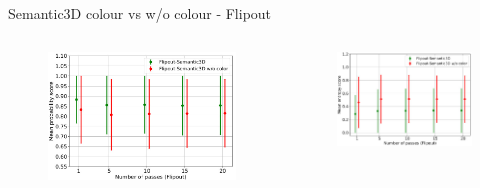 \documentclass[aspectratio=169]{beamer}
\begin{document}
\begin{frame}{Semantic3D colour vs w/o colour - Flipout}
    \begin{columns}
        \begin{column}{0.5\textwidth}
            \begin{figure}
                \centering
                \includegraphics[scale=0.25]{images/ood2/Fout_MSP_OOD2.jpg}
            \end{figure}
        \end{column}
        \begin{column}{0.5\textwidth}
            \begin{figure}
                \centering
                \includegraphics[scale=0.32]{images/ood2/Fout_Ent_OOD2.jpg}

\end{figure}
\end{column}
\end{columns}
\end{frame}
\end{document}
